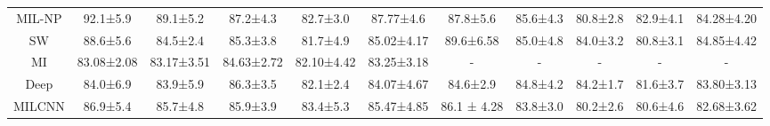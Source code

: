 \documentclass[conference]{IEEEtran}
\begin{document}
\begin{table*}[ht]
\begin{adjustbox}{max width=\textwidth}
\begin{tabular}{c|cccc|c|cccc|c}
MIL-NP\cite{sudharshan2019multiple}        & \multicolumn{1}{c|}{92.1±5.9}            & \multicolumn{1}{c|}{89.1±5.2}                                    & \multicolumn{1}{c|}{87.2±4.3}                                   & 82.7±3.0                                   & 87.77±4.6              & \multicolumn{1}{c|}{87.8±5.6}            & \multicolumn{1}{c|}{85.6±4.3}            & \multicolumn{1}{c|}{80.8±2.8}            & 82.9±4.1            & \multicolumn{1}{l}{{\color[HTML]{444444} 84.28±4.20}} \\
SW\cite{spanhol2016breast}                 & \multicolumn{1}{c|}{88.6±5.6}            & \multicolumn{1}{c|}{84.5±2.4}                                    & \multicolumn{1}{c|}{85.3±3.8}                                   & 81.7±4.9                                   & 85.02±4.17             & \multicolumn{1}{c|}{89.6±6.58}           & \multicolumn{1}{c|}{85.0±4.8}            & \multicolumn{1}{c|}{84.0±3.2}            & 80.8±3.1            & \multicolumn{1}{l}{{\color[HTML]{444444} 84.85±4.42}} \\
MI\cite{bayramoglu2016deep}                & \multicolumn{1}{c|}{83.08±2.08}          & \multicolumn{1}{c|}{83.17±3.51}                                  & \multicolumn{1}{c|}{84.63±2.72}                                 & 82.10±4.42                                 & 83.25±3.18             & \multicolumn{1}{c|}{-}                   & \multicolumn{1}{c|}{-}                   & \multicolumn{1}{c|}{-}                   & -                   & -                                                     \\
Deep\cite{spanhol2017deep}                 & \multicolumn{1}{c|}{84.0±6.9}            & \multicolumn{1}{c|}{83.9±5.9}                                    & \multicolumn{1}{c|}{86.3±3.5}                                   & 82.1±2.4                                   & 84.07±4.67             & \multicolumn{1}{c|}{84.6±2.9}            & \multicolumn{1}{c|}{84.8±4.2}            & \multicolumn{1}{c|}{84.2±1.7}            & 81.6±3.7            & \multicolumn{1}{l}{{\color[HTML]{444444} 83.80±3.13}} \\
MILCNN\cite{sudharshan2019multiple}        & \multicolumn{1}{c|}{86.9±5.4}            & \multicolumn{1}{c|}{85.7±4.8}                                    & \multicolumn{1}{c|}{85.9±3.9}                                   & 83.4±5.3                                   & 85.47±4.85             & \multicolumn{1}{c|}{86.1 ± 4.28}         & \multicolumn{1}{c|}{83.8±3.0}            & \multicolumn{1}{c|}{80.2±2.6}            & 80.6±4.6            & \multicolumn{1}{l}{{\color[HTML]{444444} 82.68±3.62}} \\

\end{tabular}
\end{adjustbox}
\end{table*}
\end{document}
